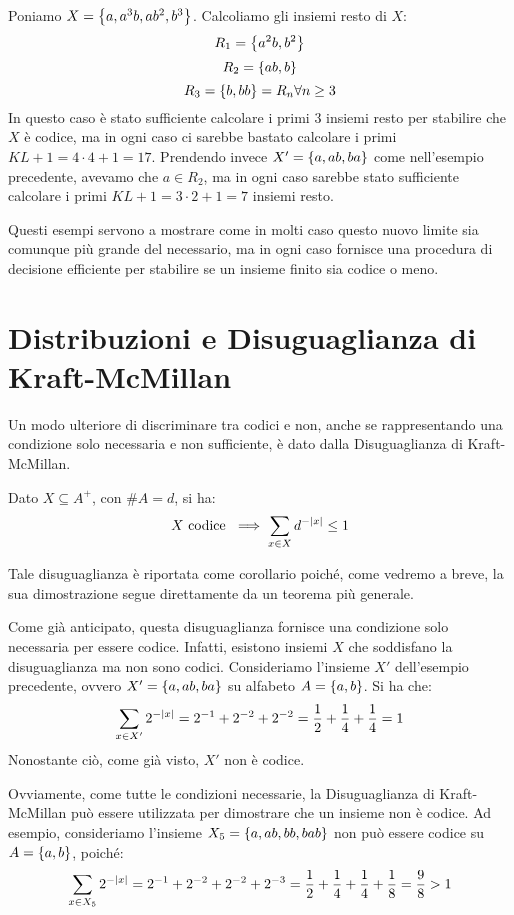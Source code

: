 \begin{example}
  Poniamo \(X = \set{a,a^3b,ab^2,b^3}\). Calcoliamo gli insiemi resto di \(X\):
  \[R_1 = \set{a^2b,b^2}\]
  \[R_2 = \set{ab,b}\]
  \[R_3 = \set{b,bb} = R_n \forall n \geq 3\]
  In questo caso è stato sufficiente calcolare i primi \(3\) insiemi resto per stabilire che \(X\) è codice, ma in ogni caso ci sarebbe bastato calcolare i primi \(KL+1 = 4\cdot 4 + 1 = 17\).
  Prendendo invece \(X' = \set{a,ab,ba}\) come nell'esempio precedente, avevamo che \(a \in R_2\), ma in ogni caso sarebbe stato sufficiente calcolare i primi \(KL+1 = 3\cdot 2 + 1 = 7\) insiemi resto.
\end{example}

Questi esempi servono a mostrare come in molti caso questo nuovo limite sia comunque più grande del necessario, ma in ogni caso fornisce una procedura di decisione efficiente per stabilire se un insieme finito sia codice o meno.

\section{Distribuzioni e Disuguaglianza di Kraft-McMillan}

Un modo ulteriore di discriminare tra codici e non, anche se rappresentando una condizione solo necessaria e non sufficiente, è dato dalla Disuguaglianza di Kraft-McMillan.
\begin{corollary}\label{cor:kraft-mcmillan_inequality}
  Dato \(X \subseteq A^+\), con \(\# A = d\), si ha:
    \[X \text{ codice } \implies \sum_{x \in X} d^{-\left|x\right|} \leq 1\]
\end{corollary}

Tale disuguaglianza è riportata come corollario poiché, come vedremo a breve, la sua dimostrazione segue direttamente da un teorema più generale.

\begin{example}\label{ex:kraft-mcmillan}
  Come già anticipato, questa disuguaglianza fornisce una condizione solo necessaria per essere codice. Infatti, esistono insiemi \(X\) che soddisfano la disuguaglianza ma non sono codici.
  Consideriamo l'insieme \(X'\) dell'esempio precedente, ovvero \(X' = \set{a,ab,ba}\) su alfabeto \(A = \set{a,b}\).
  Si ha che:
  \[\sum_{x \in X'} 2^{-\left|x\right|}= 2^{-1} + 2^{-2} + 2^{-2} = \frac{1}{2} + \frac{1}{4} + \frac{1}{4} = 1\]
  Nonostante ciò, come già visto, \(X'\) non è codice.
  
  Ovviamente, come tutte le condizioni necessarie, la Disuguaglianza di Kraft-McMillan può essere utilizzata per dimostrare che un insieme non è codice.
  Ad esempio, consideriamo l'insieme \(X_5 = \set{a,ab,bb,bab}\) non può essere codice su \(A = \set{a,b}\), poiché:
  \[\sum_{x \in X_5} 2^{-\left|x\right|}= 2^{-1} + 2^{-2} + 2^{-2} + 2^{-3} = \frac{1}{2} + \frac{1}{4} + \frac{1}{4} + \frac{1}{8} = \frac{9}{8} > 1\]
\end{example}

